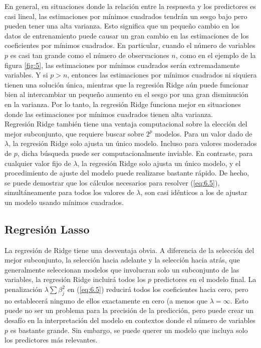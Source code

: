 En general, en situaciones donde la relación entre la respuesta y los predictores es casi lineal, las estimaciones por mínimos cuadrados tendrán un sesgo bajo pero pueden tener una alta varianza. Esto significa que un pequeño cambio en los datos de entrenamiento puede causar un gran cambio en las estimaciones de los coeficientes por mínimos cuadrados. En particular, cuando el número de variables $p$ es casi tan grande como el número de observaciones $n$, como en el ejemplo de la figura \ref{fig:5}, las estimaciones por mínimos cuadrados serán extremadamente variables. Y si $p > n$, entonces las estimaciones por mínimos cuadrados ni siquiera tienen una solución única, mientras que la regresión Ridge aún puede funcionar bien al intercambiar un pequeño aumento en el sesgo por una gran disminución en la varianza. Por lo tanto, la regresión Ridge funciona mejor en situaciones donde las estimaciones por mínimos cuadrados tienen alta varianza. \\

Regresión Ridge también tiene una ventaja computacional sobre la elección del mejor subconjunto, que requiere buscar sobre $2^p$ modelos. Para un valor dado de $\lambda$, la regresión Ridge solo ajusta un único modelo. Incluso para valores moderados de $p$, dicha búsqueda puede ser computacionalmente inviable. En contraste, para cualquier valor fijo de $\lambda$, la regresión Ridge solo ajusta un único modelo, y el procedimiento de ajuste del modelo puede realizarse bastante rápido. De hecho, se puede demostrar que los cálculos necesarios para resolver (\ref{eq:6.5}), simultáneamente para todos los valores de $\lambda$, son casi idénticos a los de ajustar un modelo usando mínimos cuadrados. 

\subsection{Regresión Lasso}

La regresión de Ridge tiene una desventaja obvia. A diferencia de la selección del mejor subconjunto, la selección hacia adelante y la selección hacia atrás, que generalmente seleccionan modelos que involucran solo un subconjunto de las variables, la regresión Ridge incluirá todos los $p$ predictores en el modelo final. La penalización $\lambda \sum \beta_j^2$ en (\ref{eq:6.5}) reducirá todos los coeficientes hacia cero, pero no establecerá ninguno de ellos exactamente en cero (a menos que $\lambda = \infty$. Esto puede no ser un problema para la precisión de la predicción, pero puede crear un desafío en la interpretación del modelo en contextos donde el número de variables $p$ es bastante grande. Sin embargo, se puede querer un modelo que incluya solo los predictores más relevantes. \\

